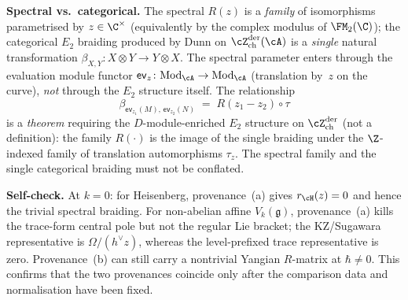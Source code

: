 \begin{remark}
\noindent\textbf{Spectral vs.\ categorical.} The spectral $R(z)$ is a \emph{family} of isomorphisms parametrised by $z\in\C^\times$ (equivalently by the complex modulus of $\FM_2(\C)$); the categorical $E_2$ braiding produced by Dunn on $\cZ^{\mathrm{der}}_{\mathrm{ch}}(\cA)$ is a \emph{single} natural transformation $\beta_{X,Y}\colon X\otimes Y\to Y\otimes X$. The spectral parameter enters through the evaluation module functor $\mathsf{ev}_z\colon \mathrm{Mod}_\cA \to \mathrm{Mod}_\cA$ (translation by~$z$ on the curve), \emph{not} through the $E_2$ structure itself. The relationship
\[
\beta_{\mathsf{ev}_{z_1}(M),\,\mathsf{ev}_{z_2}(N)} \;=\; R(z_1 - z_2)\circ\tau
\]
is a \emph{theorem} requiring the $D$-module-enriched $E_2$ structure on $\cZ^{\mathrm{der}}_{\mathrm{ch}}$ (not a definition): the family $R(\cdot)$ is the image of the single braiding under the $\Z$-indexed family of translation automorphisms $\tau_z$. The spectral family and the single categorical braiding must not be conflated.

\noindent\textbf{Self-check.} At \(k=0\): for Heisenberg,
provenance~(a) gives \(r_{\cH}(z)=0\) and hence the trivial
spectral braiding. For non-abelian affine \(V_k(\mathfrak g)\),
provenance~(a) kills the trace-form central pole but not the regular
Lie bracket; the KZ/Sugawara representative is
\(\Omega/(h^\vee z)\), whereas the level-prefixed trace representative
is zero. Provenance~(b) can still carry a nontrivial Yangian
\(R\)-matrix at \(\hbar\neq0\). This confirms that the two
provenances coincide only after the comparison data and normalisation
have been fixed.
\end{remark}

